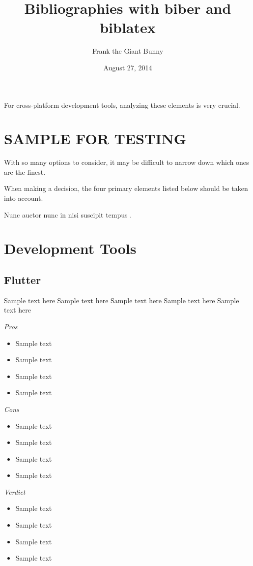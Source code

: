 \documentclass[11pt]{article}
\begin{document}
For cross-platform development tools, analyzing these elements is very crucial.


\section{SAMPLE FOR TESTING}

With\cite{hackernoon} so many options\cite{shah} to consider, it may be difficult to narrow down which ones are the finest.\par
When making a decision\cite{aayush}, the four primary elements listed below should be taken into account.\cite{Gusfield}



\title{Bibliographies with biber and biblatex}
\author{Frank the Giant Bunny}
\date{August 27, 2014}
\maketitle

Nunc auctor nunc in nisi suscipit tempus \cite{black1973poa}.





\section{Development Tools}


\subsection{Flutter}

Sample text here
Sample text here
Sample text here
Sample text here
Sample text here \par

\emph{Pros}
\begin{itemize}
  \setlength{\itemsep}{0mm}  
  \item Sample text
  \item Sample text
  \item Sample text
  \item Sample text
\end{itemize}
\par
\emph{Cons}
\begin{itemize}
  \setlength{\itemsep}{0mm}  
  \item Sample text
  \item Sample text
  \item Sample text
  \item Sample text
\end{itemize}
\par
\emph{Verdict}
\begin{itemize}
  \setlength{\itemsep}{0mm}  
  \item Sample text
  \item Sample text
  \item Sample text
  \item Sample text
\end{itemize}
\end{document}
